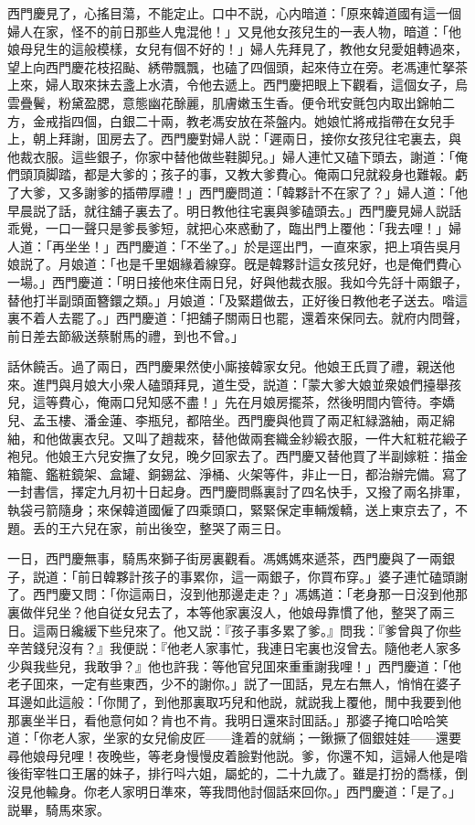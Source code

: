 西門慶見了，心搖目蕩，不能定止。口中不説，心内暗道：「原來韓道國有這一個婦人在家，怪不的前日那些人鬼混他！」又見他女孩兒生的一表人物，暗道：「他娘母兒生的這般模樣，女兒有個不好的！」婦人先拜見了，教他女兒愛姐轉過來，望上向西門慶花枝招颭、綉帶飄飄，也磕了四個頭，起來侍立在旁。老馮連忙拏茶上來，婦人取來抹去盞上水漬，令他去遞上。西門慶把眼上下觀看，這個女子，烏雲疊鬢，粉黛盈腮，意態幽花酴麗，肌膚嫩玉生香。便令玳安氈包内取出錦帕二方，金戒指四個，白銀二十兩，教老馮安放在茶盤内。她娘忙將戒指帶在女兒手上，朝上拜謝，囬房去了。西門慶對婦人説：「遲兩日，接你女孩兒往宅裏去，與他裁衣服。這些銀子，你家中替他做些鞋脚兒。」婦人連忙又磕下頭去，謝道：「俺們頭頂脚踏，都是大爹的；孩子的事，又教大爹費心。俺兩口兒就殺身也難報。虧了大爹，又多謝爹的插帶厚禮！」西門慶問道：「韓夥計不在家了？」婦人道：「他早晨説了話，就往舖子裏去了。明日教他往宅裏與爹磕頭去。」西門慶見婦人説話乖覺，一口一聲只是爹長爹短，就把心來惑動了，臨出門上覆他：「我去哩！」婦人道：「再坐坐！」西門慶道：「不坐了。」於是逕出門，一直來家，把上項告吳月娘説了。月娘道：「也是千里姻緣着線穿。旣是韓夥計這女孩兒好，也是俺們費心一場。」西門慶道：「明日接他來住兩日兒，好與他裁衣服。我如今先㧱十兩銀子，替他打半副頭面簪鐶之類。」月娘道：「及緊趲做去，正好後日教他老子送去。喒這裏不着人去罷了。」西門慶道：「把舖子關兩日也罷，還着來保同去。就府内問聲，前日差去節級送蔡駙馬的禮，到也不曾。」

話休饒舌。過了兩日，西門慶果然使小廝接韓家女兒。他娘王氏買了禮，親送他來。進門與月娘大小衆人磕頭拜見，道生受，説道：「蒙大爹大娘並衆娘們擡舉孩兒，這等費心，俺兩口兒知感不盡！」先在月娘房擺茶，然後明間内管待。李嬌兒、孟玉樓、潘金蓮、李瓶兒，都陪坐。西門慶與他買了兩疋紅緑潞紬，兩疋綿紬，和他做裏衣兒。又叫了趙裁來，替他做兩套織金紗緞衣服，一件大紅粧花緞子袍兒。他娘王六兒安撫了女兒，晚夕回家去了。西門慶又替他買了半副嫁粧：描金箱籠、鑑粧鏡架、盒罐、銅錫盆、淨桶、火架等件，非止一日，都治辦完備。寫了一封書信，擇定九月初十日起身。西門慶問縣裏討了四名快手，又撥了兩名排軍，執袋弓箭隨身；來保韓道國僱了四乘頭口，緊緊保定車輛煖轎，送上東京去了，不題。丢的王六兒在家，前出後空，整哭了兩三日。

一日，西門慶無事，騎馬來獅子街房裏觀看。馮媽媽來遞茶，西門慶與了一兩銀子，説道：「前日韓夥計孩子的事累你，這一兩銀子，你買布穿。」婆子連忙磕頭謝了。西門慶又問：「你這兩日，沒到他那邊走走？」馮媽道：「老身那一日沒到他那裏做伴兒坐？他自従女兒去了，本等他家裏沒人，他娘母靠慣了他，整哭了兩三日。這兩日纔緩下些兒來了。他又説：『孩子事多累了爹。』問我：『爹曾與了你些辛苦錢兒沒有？』我便説：『他老人家事忙，我連日宅裏也沒曾去。隨他老人家多少與我些兒，我敢爭？』他也許我：等他官兒囬來重重謝我哩！」西門慶道：「他老子囬來，一定有些東西，少不的謝你。」説了一囬話，見左右無人，悄悄在婆子耳邊如此這般：「你閒了，到他那裏取巧兒和他説，就説我上覆他，閒中我要到他那裏坐半日，看他意何如？肯也不肯。我明日還來討囬話。」那婆子掩口哈哈笑道：「你老人家，坐家的女兒偷皮匠——逢着的就緔；一鍬撅了個銀娃娃——還要尋他娘母兒哩！夜晚些，等老身慢慢皮着臉對他説。爹，你還不知，這婦人他是喒後街宰牲口王屠的妹子，排行呌六姐，屬蛇的，二十九歲了。雖是打扮的喬樣，倒沒見他輸身。你老人家明日準來，等我問他討個話來回你。」西門慶道：「是了。」説畢，騎馬來家。

